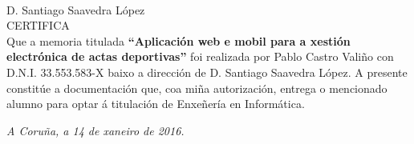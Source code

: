 \thispagestyle{empty}
\mbox{}\\[4cm]
\noindent D. Santiago Saavedra López \\[1cm]
\textsc{CERTIFICA}\\[1.5cm]
\indent Que a memoria titulada \textbf{``Aplicación web e mobil para a xestión 
electrónica de actas deportivas''}
foi realizada por Pablo Castro Valiño con D.N.I. 33.553.583-X baixo a
dirección de D. Santiago Saavedra López. A presente constitúe a
documentación que, coa miña autorización, entrega o mencionado
alumno para optar á titulación de Enxeñería en Informática.
\vfill
\begin{flushright}
\emph{A Coruña, a 14 de xaneiro de 2016.} \\[2cm]
\end{flushright}